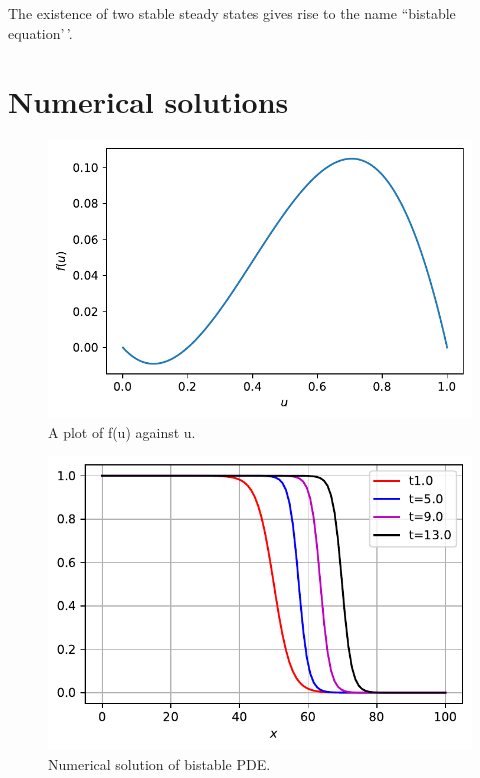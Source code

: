 \documentclass[
  letterpaper,
  DIV=11,
  numbers=noendperiod]{scrreprt}
\theoremstyle{plain}
\theoremstyle{definition}
\theoremstyle{plain}
\theoremstyle{remark}
\begin{document}
The existence of two stable steady states gives rise to the name
``bistable equation'\,'.

\hypertarget{numerical-solutions-2}{%
\section{Numerical solutions}\label{numerical-solutions-2}}

\begin{figure}

{\centering \includegraphics{nonlinearreactiondiffusion_files/figure-pdf/fig-bistablepde-output-1.pdf}

}

\caption{\label{fig-bistablepde}A plot of f(u) against u.}

\end{figure}

\begin{figure}

{\centering \includegraphics{nonlinearreactiondiffusion_files/figure-pdf/fig-bistablepde-output-2.pdf}

}

\caption{\label{fig-bistablepde}Numerical solution of bistable PDE.}

\end{figure}
\end{document}

